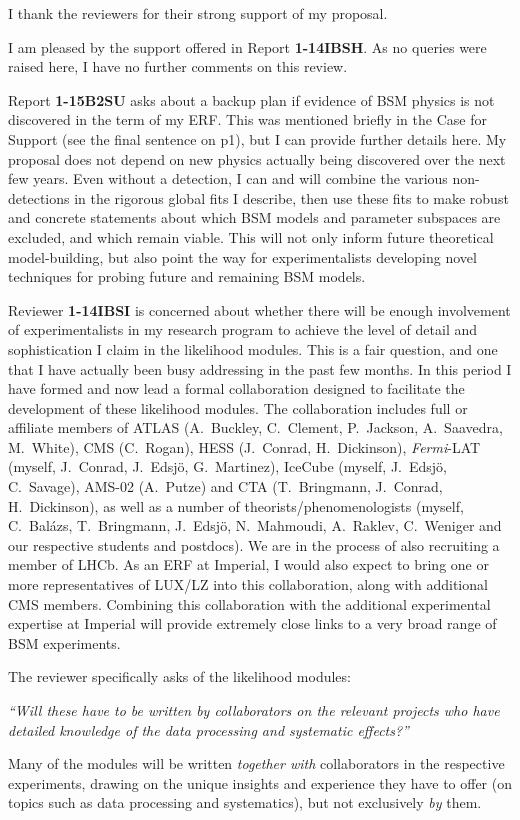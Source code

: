 \documentclass[11pt,oneside,twocolumn,a4paper]{article}
\author{Pat Scott}
\date{}
\begin{document}
\thispagestyle{fancy}

I thank the reviewers for their strong support of my proposal.  \vspace{4mm}

I am pleased by the support offered in Report \textbf{1-14IBSH}.  As no queries were raised here, I have no further comments on this review.\vspace{4mm}

Report \textbf{1-15B2SU} asks about a backup plan if evidence of BSM physics is not discovered in the term of my ERF.  This was mentioned briefly in the Case for Support (see the final sentence on p1), but I can provide further details here.  My proposal does not depend on new physics actually being discovered over the next few years.  Even without a detection, I can and will combine the various non-detections in the rigorous global fits I describe, then use these fits to make robust and concrete statements about which BSM models and parameter subspaces are excluded, and which remain viable.  This will not only inform future theoretical model-building, but also point the way for experimentalists developing novel techniques for probing future and remaining BSM models.  \vspace{4mm}

Reviewer \textbf{1-14IBSI} is concerned about whether there will be enough involvement of experimentalists in my research program to achieve the level of detail and sophistication I claim in the likelihood modules.  This is a fair question, and one that I have actually been busy addressing in the past few months.  In this period I have formed and now lead a formal collaboration designed to facilitate the development of these likelihood modules.  The collaboration includes full or affiliate members of ATLAS (A.~Buckley, C.~Clement, P.~Jackson, A.~Saavedra, M.~White), CMS (C.~Rogan), HESS (J.~Conrad, H.~Dickinson), \textit{Fermi}-LAT (myself, J.~Conrad, J.~Edsj\"o, G.~Martinez), IceCube (myself, J.~Edsj\"o, C.~Savage), AMS-02 (A.~Putze) and CTA (T.~Bringmann, J.~Conrad, H.~Dickinson), as well as a number of theorists/phenomenologists (myself, C.~Bal\'azs, T.~Bringmann, J.~Edsj\"o, N.~Mahmoudi, A.~Raklev, C.~Weniger and our respective students and postdocs).  We are in the process of also recruiting a member of LHCb.  As an ERF at Imperial, I would also expect to bring one or more representatives of LUX/LZ into this collaboration, along with additional CMS members.    Combining this collaboration with the additional experimental expertise at Imperial will provide extremely close links to a very broad range of BSM experiments.

The reviewer specifically asks of the likelihood modules: 

\vspace{3mm}\noindent\textit{``Will these have to be written by collaborators on the relevant projects who have detailed knowledge of the data processing and systematic effects?''}\vspace{3mm}

Many of the modules will be written \textit{together with} collaborators in the respective experiments, drawing on the unique insights and experience they have to offer (on topics such as data processing and systematics), but not exclusively \textit{by} them.
\end{document}
